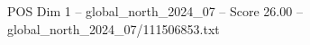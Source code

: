 \begin{textsample}{POS Dim 1 – global\_north\_2024\_07 – Score 26.00 – global\_north\_2024\_07/111506853.txt}
\end{textsample}
